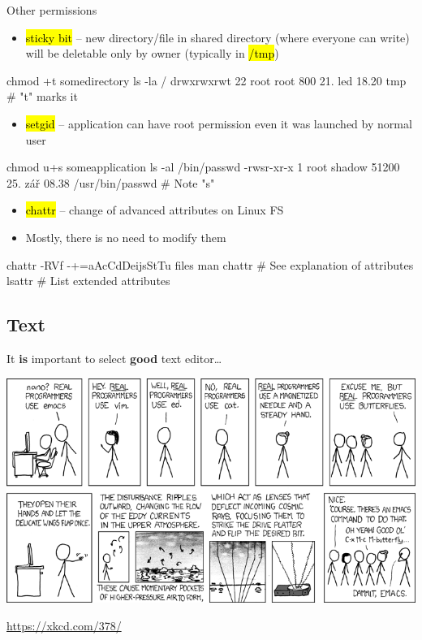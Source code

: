 \documentclass[compress, ucs, xelatex, 11pt, xcolor=svgnames,
  hyperref={
    bookmarks=true,
    unicode=true,
    colorlinks=true,
    pdftitle={Linux, command line and MetaCentrum},
    plainpages=false,
    pdfauthor={Vojtech Zeisek},
    pdfsubject={Course about use of Linux command line, writing shell scripts and using MetaCentrum of CESNET},
    pdfcreator={XeLaTeX},
    pdfkeywords={Linux, GNU, BASH, shell, command line, MetaCentrum},
    linkcolor=DarkRed,
    anchorcolor=DarkBlue,
    citecolor=Indigo,
    filecolor=NavyBlue,
    menucolor=DarkMagenta,
    urlcolor=DarkBlue,
    pdftex},
  url={hyphens, lowtilde} %
  ]{beamer}
\renewcommand{\texttt}[1]{\hl{\ttfamily #1}}
\begin{document}
\begin{frame}[fragile]{Other permissions}
  \begin{itemize}
    \item \texttt{sticky bit} -- new directory/file in shared directory (where everyone can write) will be deletable only by owner (typically in \texttt{/tmp})
  \end{itemize}
  \begin{bashcode}
    chmod +t somedirectory
    ls -la /
    drwxrwxrwt 22 root root 800 21. led 18.20 tmp # "t" marks it
  \end{bashcode}
  \begin{itemize}
    \item \texttt{setgid} -- application can have root permission even it was launched by normal user
  \end{itemize}
  \begin{bashcode}
    chmod u+s someapplication
    ls -al /bin/passwd
    -rwsr-xr-x 1 root shadow 51200 25. zář 08.38 /usr/bin/passwd # Note "s"
  \end{bashcode}
  \begin{itemize}
    \item \texttt{chattr} -- change of advanced attributes on Linux FS
    \item Mostly, there is no need to modify them
  \end{itemize}
  \begin{bashcode}
    chattr -RVf -+=aAcCdDeijsStTu files
    man chattr # See explanation of attributes
    lsattr # List extended attributes
  \end{bashcode}
\end{frame}

\subsection{Text}

\begin{frame}{It \textbf{is} important to select \textbf{good} text editor\ldots}
  \begin{center}
    \includegraphics[width=\textwidth-1cm]{real_programmers.png}
  \end{center}
  \begin{flushright}
    \url{https://xkcd.com/378/}
  \end{flushright}
\end{frame}
\end{document}
